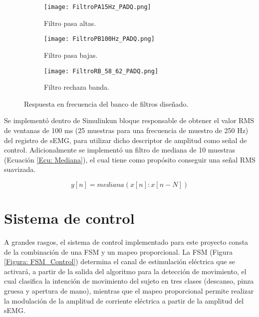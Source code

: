 \begin{figure}[htbp]
	\centering
	\begin{subfigure}[htbp]{0.7\textwidth}
		\texttt{[image: FiltroPA15Hz\_PADQ.png]}
		\caption{Filtro pasa altas.}
		\label{Figura: FiltroPA}
	\end{subfigure}
	
	\begin{subfigure}[htnp]{0.7\textwidth}
		\texttt{[image: FiltroPB100Hz\_PADQ.png]}
		\caption{Filtro pasa bajas.} 
		\label{Figura: FiltroPB}
	\end{subfigure}
	
	\begin{subfigure}[htbp]{0.7\textwidth}
		\texttt{[image: FiltroRB\_58\_62\_PADQ.png]}
		\caption{Filtro rechaza banda.}
		\label{Figura: FiltroRB}
	\end{subfigure}
	\caption{Respuesta en frecuencia del banco de filtros diseñado.}
	\label{Figura: Freqz_Filtros}
\end{figure}

Se implementó dentro de Simulink\textregistered \;un bloque responsable de obtener el valor RMS de ventanas de 100 ms (25 muestras para una frecuencia de muestro de 250 Hz) del registro de sEMG, para utilizar dicho descriptor de amplitud como señal de control. Adicionalmente se implementó un filtro de mediana de 10 muestras (Ecuación \ref{Ecu: Mediana}), el cual tiene como propósito conseguir una señal RMS suavizada.

\begin{equation}
	y[n] = mediana(x[n]:x[n-N])
	\label{Ecu: Mediana}
\end{equation}


\newpage
\section{Sistema de control}
A grandes rasgos, el sistema de control implementado para este proyecto consta de la combinación de una FSM y un mapeo proporcional. La FSM (Figura \ref{Figura: FSM_Control})  determina el canal de estimulación eléctrica que se activará, a partir de la salida del algoritmo para la detección de movimiento, el cual clasifica la intención de movimiento del sujeto en tres clases (descanso, pinza gruesa y apertura de mano), mientras que el mapeo proporcional permite realizar la modulación de la amplitud de corriente eléctrica a partir de la amplitud del sEMG.

